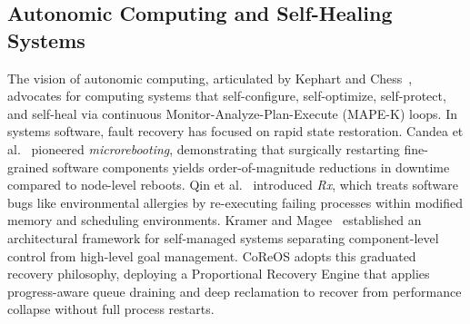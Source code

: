 \documentclass[conference]{IEEEtran}
\begin{document}
\subsection{Autonomic Computing and Self-Healing Systems}
The vision of autonomic computing, articulated by Kephart and Chess~\cite{kephart2003vision}, advocates for computing systems that self-configure, self-optimize, self-protect, and self-heal via continuous Monitor-Analyze-Plan-Execute (MAPE-K) loops. In systems software, fault recovery has focused on rapid state restoration. Candea et al.~\cite{candea2004microreboot} pioneered \textit{microrebooting}, demonstrating that surgically restarting fine-grained software components yields order-of-magnitude reductions in downtime compared to node-level reboots. Qin et al.~\cite{qin2005rx} introduced \textit{Rx}, which treats software bugs like environmental allergies by re-executing failing processes within modified memory and scheduling environments. Kramer and Magee~\cite{kramer2007self} established an architectural framework for self-managed systems separating component-level control from high-level goal management. CoReOS adopts this graduated recovery philosophy, deploying a Proportional Recovery Engine that applies progress-aware queue draining and deep reclamation to recover from performance collapse without full process restarts.
\end{document}
